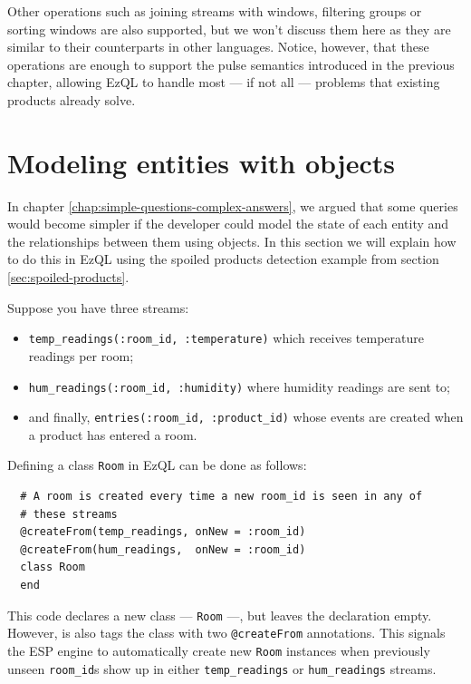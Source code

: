 \documentclass[a4,11pt]{report}
\begin{document}
Other operations such as joining streams with windows, filtering
groups or sorting windows are also supported, but we won't discuss
them here as they are similar to their counterparts in other
languages. Notice, however, that these operations are enough to
support the pulse semantics introduced in the previous chapter,
allowing EzQL to handle most --- if not all --- problems that existing
products already solve.

\section{Modeling entities with objects}
\label{sec:objects}

In chapter \ref{chap:simple-questions-complex-answers}, we argued that
some queries would become simpler if the developer could model the
state of each entity and the relationships between them using
objects. In this section we will explain how to do this in EzQL using
the spoiled products detection example from section
\ref{sec:spoiled-products}.

Suppose you have three streams:

\begin{itemize}
\item \verb=temp_readings(:room_id, :temperature)= which receives
  temperature readings per room;
\item \verb=hum_readings(:room_id, :humidity)= where humidity readings
  are sent to;
\item and finally, \verb=entries(:room_id, :product_id)= whose events
  are created when a product has entered a room.
\end{itemize}

Defining a class \verb=Room= in EzQL can be done as follows:

\begin{lstlisting}
  # A room is created every time a new room_id is seen in any of
  # these streams
  @createFrom(temp_readings, onNew = :room_id)
  @createFrom(hum_readings,  onNew = :room_id)
  class Room
  end
\end{lstlisting}

This code declares a new class --- \verb=Room= ---, but leaves the
declaration empty. However, is also tags the class with two
\verb=@createFrom= annotations. This signals the ESP engine to
automatically create new \verb=Room= instances when previously unseen
\verb=room_id=s show up in either \verb=temp_readings= or
\verb=hum_readings= streams.
\end{document}
